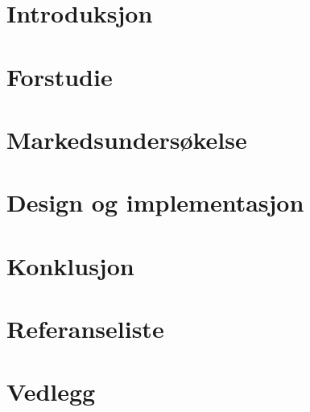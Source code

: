 \documentclass[11pt, a4paper]{report}
\newcommand{\comment}[1]{} \comment{This is a block comment wrapped in curly brackets}
\begin{document}



%
%

\tableofcontents
\newpage
{}



\comment{ foreløpig struktur på rapport:
Sammendrag
Innhold
Introduksjon
	Gruppen
	Initiativet
	Problemet
	Ideen
Pre study
	Mekanikk
	Hardware
	Software
Markedsundersøkelse
	generelt
	4 p'er
Løsning
	valg av løsning
	hardware
	software
		GUI
	diskusjon
Konklusjon
Referanseliste
Vedlegg
}
\chapter{Introduksjon}
	
	
	
%
\chapter{Forstudie}
	
	
	
	
\chapter{Markedsundersøkelse}
\chapter{Design og implementasjon}
\chapter{Konklusjon}
\chapter{Referanseliste}
\chapter{Vedlegg}
%
%
%

\newpage
{}
\listoftables
{}
\listoffigures
{}



%
\end{document}
